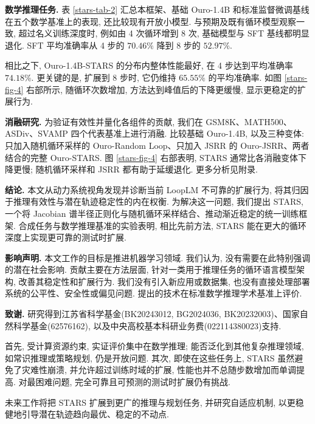 \noindent\textbf{数学推理任务.}
表 \ref{stars-tab-2} 汇总本框架、基础 Ouro-1.4B 和标准监督微调基线在五个数学基准上的表现, 还比较现有开放小模型. 与预期及既有循环模型观察一致, 超过名义训练深度时, 例如由 4 次循环增到 8 次, 基础模型与 SFT 基线都明显退化. SFT 平均准确率从 4 步的 $70.46\%$ 降到 8 步的 $52.97\%$.

相比之下, Ouro-1.4B-STARS 的分布内整体性能最好, 在 4 步达到平均准确率 $74.18\%$. 更关键的是, 扩展到 8 步时, 它仍维持 $65.55\%$ 的平均准确率. 如图 \ref{stars-fig-4} 右部所示, 随循环次数增加, 方法达到峰值后的下降更缓慢, 显示更稳定的扩展行为.

\noindent\textbf{消融研究.}\label{stars-sec-6-3}
为验证有效性并量化各组件的贡献, 我们在 GSM8K、MATH500、ASDiv、SVAMP 四个代表基准上进行消融. 比较基础 Ouro-1.4B, 以及三种变体: 只加入随机循环采样的 Ouro-Random Loop、只加入 JSRR 的 Ouro-JSRR、两者结合的完整 Ouro-STARS. 图 \ref{stars-fig-4} 右部表明, STARS 通常比各消融变体下降更慢; 随机循环采样和 JSRR 都有助于延缓退化. 更多分析见附录.

\label{stars-sec-7}
\noindent\textbf{结论.}
本文从动力系统视角发现并诊断当前 LoopLM 不可靠的扩展行为, 将其归因于推理有效性与潜在轨迹稳定性的内在权衡. 为解决这一问题, 我们提出 STARS, 一个将 Jacobian 谱半径正则化与随机循环采样结合、推动渐近稳定的统一训练框架. 合成任务与数学推理基准的实验表明, 相比先前方法, STARS 能在更大的循环深度上实现更可靠的测试时扩展.

\noindent\textbf{影响声明.}\label{stars-impact}
本文工作的目标是推进机器学习领域. 我们认为, 没有需要在此特别强调的潜在社会影响. 贡献主要在方法层面, 针对一类用于推理任务的循环语言模型架构, 改善其稳定性和扩展行为. 我们没有引入新应用或数据集, 也没有直接处理部署系统的公平性、安全性或偏见问题. 提出的技术在标准数学推理学术基准上评价.

\noindent\textbf{致谢.}\label{stars-acknowledgements}
研究得到江苏省科学基金(BK20243012, BG2024036, BK20232003)、国家自然科学基金(62576162), 以及中央高校基本科研业务费(022114380023)支持.

首先, 受计算资源约束, 实证评价集中在数学推理; 能否泛化到其他复杂推理领域, 如常识推理或策略规划, 仍是开放问题. 其次, 即使在这些任务上, STARS 虽然避免了灾难性崩溃, 并允许超过训练时域的扩展, 性能也并不总随步数增加而单调提高. 对最困难问题, 完全可靠且可预测的测试时扩展仍有挑战.

未来工作将把 STARS 扩展到更广的推理与规划任务, 并研究自适应机制, 以更稳健地引导潜在轨迹趋向最优、稳定的不动点.

